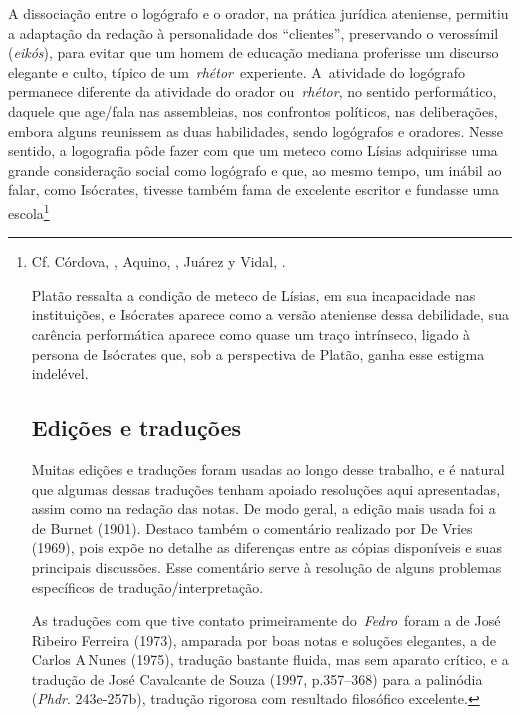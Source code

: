 A dissociação entre o logógrafo e o orador, na prática jurídica
ateniense, permitiu a adaptação da redação à personalidade dos
``clientes'', preservando o verossímil (\emph{eikós}), para evitar que
um homem de educação mediana proferisse um discurso elegante e culto,
típico de um~\emph{rhétor}~experiente. A~atividade do logógrafo
permanece diferente da atividade do orador ou~\emph{rhétor}, no sentido
performático, daquele que age/\allowbreak{}fala nas assembleias, nos confrontos
políticos, nas deliberações, embora alguns reunissem as duas
habilidades, sendo logógrafos e oradores. Nesse sentido, a logografia
pôde fazer com que um meteco como Lísias adquirisse uma grande
consideração social como logógrafo e que, ao mesmo tempo, um inábil ao
falar, como Isócrates, tivesse também fama de excelente escritor e
fundasse uma escola\footnote{Cf. Córdova, , Aquino, , Juárez  y Vidal, .

Platão ressalta a condição de meteco de Lísias, em sua incapacidade nas
instituições, e Isócrates aparece como a versão ateniense dessa
debilidade, sua carência performática aparece como quase um traço
intrínseco, ligado à persona de Isócrates que, sob a perspectiva de
Platão, ganha esse estigma indelével.

 

\section{Edições e traduções}

 

Muitas edições e traduções foram usadas ao longo desse trabalho, e é
natural que algumas dessas traduções tenham apoiado resoluções aqui
apresentadas, assim como na redação das notas. De modo geral, a edição
mais usada foi a de Burnet (1901). Destaco também o comentário realizado
por De Vries (1969), pois expõe no detalhe as diferenças entre as cópias
disponíveis e suas principais discussões. Esse comentário serve à
resolução de alguns problemas específicos de tradução/\allowbreak{}interpretação.

As traduções com que tive contato primeiramente do~\emph{Fedro}~foram a de
José Ribeiro Ferreira (1973), amparada por boas notas e soluções
elegantes, a de Carlos A\,Nunes (1975), tradução bastante fluida, mas
sem aparato crítico, e a tradução de José Cavalcante de Souza (1997,
p.357--368) para a palinódia (\emph{Phdr}. 243e-257b), tradução rigorosa
com resultado filosófico excelente.

}
